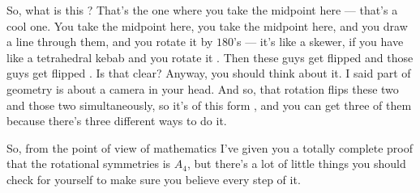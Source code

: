 \begin{proofWrapper}[Proof that \texorpdfstring{$\operatorname{Rot}(\text{Tetrahedron}) = A_4$}{Rot(Tetrahedron) = A\_4}]
\begin{speech}[00:43:02 - 00:44:00]
So, what is this ? That's the one where you take the midpoint here --- that's a cool one. You take the midpoint here, you take the midpoint here, and you draw a line through them, and you rotate it by $180$'s --- it's like a skewer, if you have like a tetrahedral kebab and you rotate it . Then these guys get flipped and those guys get flipped . Is that clear? Anyway, you should think about it. I said part of geometry is about a camera in your head. And so, that rotation flips these two and those two simultaneously, so it's of this form , and you can get three of them because there's three different ways to do it.

So, from the point of view of mathematics I've given you a totally complete proof that the rotational symmetries is $A_4$, but there's a lot of little things you should check for yourself to make sure you believe every step of it.
\end{speech}


\end{proofWrapper}
